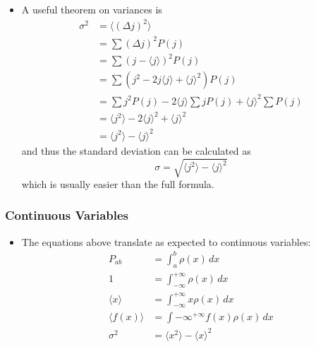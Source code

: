 \documentclass{article}
\begin{document}
\begin{itemize}
  \item A useful theorem on variances is \begin{align*}
          \sigma^2 & = \langle (\Delta j)^2 \rangle                                                    \\
                   & = \sum (\Delta j)^2 P(j)                                                          \\
                   & = \sum (j - \langle j \rangle)^2 P(j)                                             \\
                   & = \sum (j^2 - 2 j \langle j \rangle + \langle j \rangle^2) P(j)                   \\
                   & = \sum j^2 P(j) - 2 \langle j \rangle \sum j P(j) + \langle j \rangle^2 \sum P(j) \\
                   & = \langle j^2 \rangle - 2 \langle j \rangle^2 + \langle j \rangle^2               \\
                   & = \langle j^2 \rangle - \langle j \rangle^2
        \end{align*} and thus the standard deviation can be calculated as \[\sigma = \sqrt{\langle j^2 \rangle - \langle j \rangle^2}\] which is usually easier than the full formula.
\end{itemize}

\subsubsection{Continuous Variables}

\begin{itemize}
  \item The equations above translate as expected to continuous variables: \begin{align*}
          P_{a b}              & = \int_a^b \rho(x) \,d x                     \\
          1                    & = \int_{-\infty}^{+\infty} \rho(x) \,d x     \\
          \langle x \rangle    & = \int_{-\infty}^{+\infty} x \rho(x) \,d x   \\
          \langle f(x) \rangle & = \int{-\infty}^{+\infty} f(x) \rho(x) \,d x \\
          \sigma^2             & = \langle x^2 \rangle - \langle x \rangle^2
        \end{align*}
\end{itemize}
\end{document}
